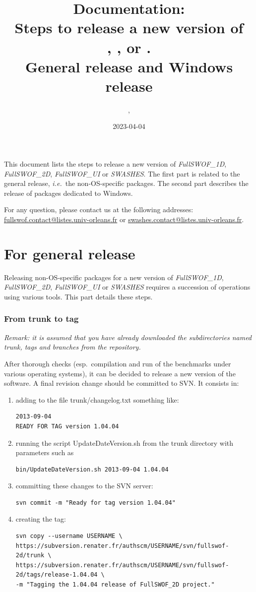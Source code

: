 \documentclass[a4paper, 11pt]{article}
\title{Documentation:\\
Steps to release a new version of\\
\FullSWOFoneD, \FullSWOFtwoD{}, \FullSWOFUI{} or \SWASHES{}.\\
General release and Windows release}
\author{\contactFullName, \contactEmail}
\date{2023-04-04}
\makeatletter
\newcommand{\FullSWOFoneD}{\emph{FullSWOF\_1D}}
\newcommand{\FullSWOFtwoD}{\emph{FullSWOF\_2D}}
\newcommand{\FullSWOFUI}{\emph{FullSWOF\_UI}}
\newcommand{\SWASHES}{\emph{SWASHES}}
\newcommand{\contactFS}{\href{mailto:fullswof.contact@listes.univ-orleans.fr}{fullswof.contact@listes.univ-orleans.fr}}
\newcommand{\contactSWASHES}{\href{mailto:swashes.contact@listes.univ-orleans.fr}{swashes.contact@listes.univ-orleans.fr}}
\makeatother
\begin{document}
\maketitle

\thispagestyle{fancy}

This document lists the steps to release a new version of \FullSWOFoneD, \FullSWOFtwoD{}, \FullSWOFUI{} or \SWASHES{}. The first part is related to the general release, \emph{i.e.}~the non-OS-specific packages. The second part describes the release of packages dedicated to Windows.

For any question, please contact us at the following addresses: \contactFS{} or \contactSWASHES{}.

\part{For general release}

Releasing non-OS-specific packages for a new version of \FullSWOFoneD, \FullSWOFtwoD{}, \FullSWOFUI{} or \SWASHES{} requires a succession of operations using various tools. 
This part details these steps.


\section{From trunk to tag}

\emph{Remark: it is assumed that you have already downloaded the subdirectories named trunk, tags and branches from the repository.}

After thorough checks (esp.\ compilation and run of the benchmarks under various operating systems), it can be decided to release a new version of the software. A final revision change should be committed to SVN\@. It consists in: 
\begin{enumerate}
\item adding to the file trunk/changelog.txt something like:
\begin{verbatim}
2013-09-04
READY FOR TAG version 1.04.04
\end{verbatim}
\item running the script UpdateDateVersion.sh  from the trunk directory with parameters such as
\begin{verbatim}
bin/UpdateDateVersion.sh 2013-09-04 1.04.04
\end{verbatim}
\item committing these changes to the SVN server:
\begin{verbatim}
svn commit -m "Ready for tag version 1.04.04"
\end{verbatim}
\item creating the tag:
\begin{verbatim}
svn copy --username USERNAME \
https://subversion.renater.fr/authscm/USERNAME/svn/fullswof-2d/trunk \
https://subversion.renater.fr/authscm/USERNAME/svn/fullswof-2d/tags/release-1.04.04 \
-m "Tagging the 1.04.04 release of FullSWOF_2D project."
\end{verbatim}
\end{enumerate}
\end{document}
